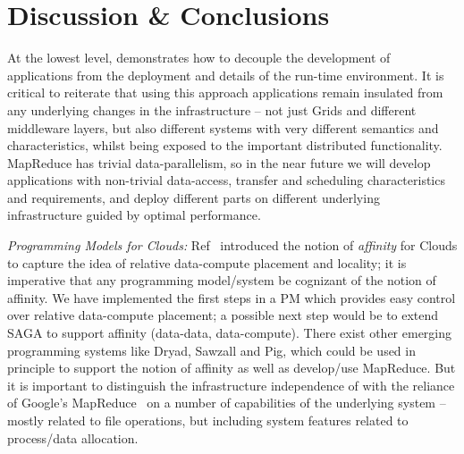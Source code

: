 \documentclass[3p,twocolumn]{elsarticle}
\begin{document}
\section{Discussion \& Conclusions}







At the lowest level, \sagamapreduce demonstrates how to decouple the
development of applications from the deployment and details of the
run-time environment.  It is critical to reiterate that using this
approach applications remain insulated from any underlying changes in
the infrastructure -- not just Grids and different middleware layers,
but also different systems with very different semantics and
characteristics, whilst being exposed to the important distributed
functionality.  MapReduce has trivial data-parallelism, so in the near
future we will develop applications with non-trivial data-access,
transfer and scheduling characteristics and requirements, and deploy
different parts on different underlying infrastructure guided by
optimal performance.

{\it Programming Models for Clouds: } Ref~\cite{jha_ccpe09} introduced
the notion of {\it affinity} for Clouds to capture the idea of
relative data-compute placement and locality; it is imperative that
any programming model/system be cognizant of the notion of
affinity. We have implemented the first steps in a PM which provides
easy control over relative data-compute placement; a possible next
step would be to extend SAGA to support affinity (data-data,
data-compute).  There exist other emerging programming systems like
Dryad, Sawzall and Pig, which could be used in principle to support
the notion of affinity as well as develop/use MapReduce.  But it is
important to distinguish the infrastructure independence of
\sagamapreduce with the reliance of Google's
MapReduce~\cite{mapreduce-paper} on a number of capabilities of the
underlying system -- mostly related to file operations, but including
system features related to process/data allocation.
\end{document}
